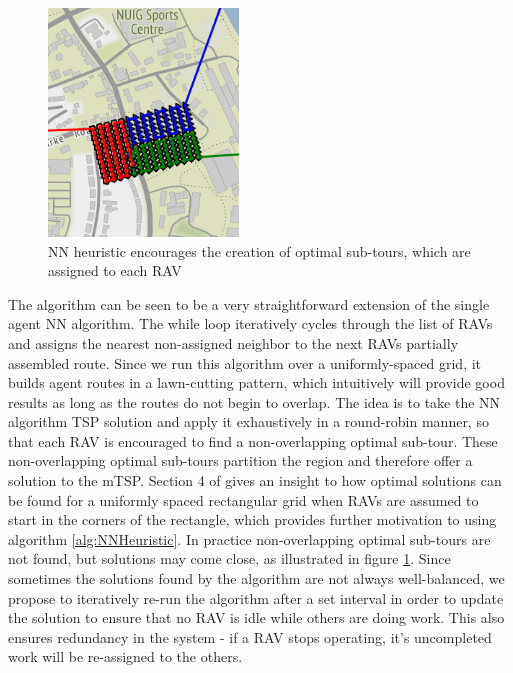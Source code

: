 \begin{figure}
\includegraphics[width=0.45\textwidth]{Chapters/MultiAgentCoverage/Figs/RAVRoutingNUIGCropped.png}
\caption{NN heuristic encourages the creation of optimal sub-tours, which are assigned to each RAV}
\label{fig:NNPartitioning}
\end{figure}
The algorithm can be seen to be a very straightforward extension of the single agent NN algorithm. The while loop iteratively cycles through the list of RAVs and assigns the nearest non-assigned neighbor to the next RAVs partially assembled route. Since we run this algorithm over a uniformly-spaced grid, it builds agent routes in a lawn-cutting pattern, which intuitively will provide good results as long as the routes do not begin to overlap. The idea is to take the NN algorithm TSP solution and apply it exhaustively in a round-robin manner, so that each RAV is encouraged to find a non-overlapping optimal sub-tour. These non-overlapping optimal sub-tours partition the region and therefore offer a solution to the mTSP. Section 4 of \cite{Hungerlander2018TheGrids} gives an insight to how optimal solutions can be found for a uniformly spaced rectangular grid when RAVs are assumed to start in the corners of the rectangle, which provides further motivation to using algorithm \ref{alg:NNHeuristic}. In practice non-overlapping optimal sub-tours are not found, but solutions may come close, as illustrated in figure \ref{fig:NNPartitioning}. Since sometimes the solutions found by the algorithm are not always well-balanced, we propose to iteratively re-run the algorithm after a set interval in order to update the solution to ensure that no RAV is idle while others are doing work. This also ensures redundancy in the system - if a RAV stops operating, it's uncompleted work will be re-assigned to the others.

